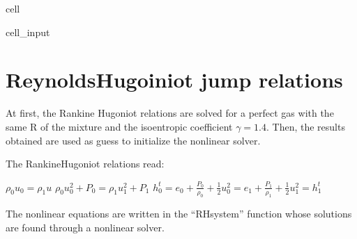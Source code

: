 \documentclass[letterpaper,10pt,english]{jupyterBook}
\begin{document}
\begin{sphinxuseclass}{cell}
\begin{sphinxVerbatimInput}
\begin{sphinxuseclass}{cell_input}
\begin{sphinxVerbatim}[commandchars=\\\{\}]
          
        
                       
                                             
          
            
         
\end{sphinxVerbatim}

\end{sphinxuseclass}\end{sphinxVerbatimInput}

\end{sphinxuseclass}

\section{Reynolds\sphinxhyphen{}Hugoiniot jump relations}
\label{\detokenize{1_Temperature/Problem_class_definition:reynolds-hugoiniot-jump-relations}}
\sphinxAtStartPar
At first, the Rankine Hugoniot relations are solved for a perfect gas with the same R of the mixture and the isoentropic coefficient \(\gamma = 1.4\). 
Then, the results obtained are used as guess to initialize the non\sphinxhyphen{}linear solver.

\sphinxAtStartPar
The Rankine\sphinxhyphen{}Hugoniot relations read: 

\sphinxAtStartPar
\( \rho_0 u_0 = \rho_1 u \) 
\( \rho_0 u_0^2 + P_0 = \rho_1 u_1^2 + P_1 \) 
\( h_0^t  = e_0 + \frac{P_0}{\rho_0} + \frac{1}{2}u_0^2 = 
e_1 + \frac{P_1}{\rho_1} + \frac{1}{2} u_1^2 = h_1^t  \)

\sphinxAtStartPar
The non\sphinxhyphen{}linear equations are written in the “RHsystem” function whose solutions are found through a non\sphinxhyphen{}linear solver.
\end{document}
